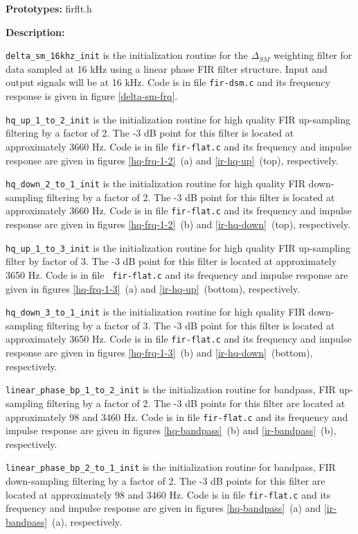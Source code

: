 {\bf Prototypes: }   firflt.h

{\bf Description: }

{\tt delta\_sm\_16khz\_init} is the initialization routine for the
$\Delta_{SM}$ weighting filter for data sampled at 16 kHz using a
linear phase FIR filter structure. Input and output signals will be at
16 kHz. Code is in file {\tt fir-dsm.c} and its frequency response is
given in figure \ref{delta-sm-frq}.

{\tt hq\_up\_1\_to\_2\_init} is the initialization routine for high
quality FIR up-sampling filtering by a factor of 2. The -3 dB point
for this filter is located at approximately 3660 Hz. Code is in file
{\tt fir-flat.c} and its frequency and impulse response are given in
figures \ref{hq-frq-1-2}~(a) and \ref{ir-hq-up}~(top), respectively.

{\tt hq\_down\_2\_to\_1\_init} is the initialization routine for high
quality FIR down-sampling filtering by a factor of 2. The -3 dB point
for this filter is located at approximately 3660 Hz. Code is in file
{\tt fir-flat.c} and its frequency and impulse response are given in
figures \ref{hq-frq-1-2}~(b) and \ref{ir-hq-down}~(top), respectively.

{\tt hq\_up\_1\_to\_3\_init} is the initialization routine for high
quality FIR up-sampling filter by factor of 3. The -3 dB point for
this filter is located at approximately 3650 Hz. Code is in file {\tt
fir-flat.c} and its frequency and impulse response are given in
figures \ref{hq-frq-1-3}~(a) and \ref{ir-hq-up}~(bottom), respectively.

{\tt hq\_down\_3\_to\_1\_init} is the initialization routine for high
quality FIR down-sampling filtering by a factor of 3. The -3 dB point
for this filter is located at approximately 3650 Hz. Code is in file
{\tt fir-flat.c} and its frequency and impulse response are given in
figures \ref{hq-frq-1-3}~(b) and \ref{ir-hq-down}~(bottom),
respectively.

{\tt linear\_phase\_bp\_1\_to\_2\_init} is the initialization routine
for bandpass, FIR up-sampling filtering by a factor of 2. The -3 dB
points for this filter are located at approximately 98 and 3460
Hz. Code is in file {\tt fir-flat.c} and its frequency and impulse
response are given in figures \ref{hq-bandpass}~(b) and
\ref{ir-bandpass}~(b), respectively.

{\tt linear\_phase\_bp\_2\_to\_1\_init} is the initialization routine
for bandpass, FIR down-sampling filtering by a factor of 2. The -3 dB
points for this filter are located at approximately 98 and 3460
Hz. Code is in file {\tt fir-flat.c} and its frequency and impulse
response are given in figures \ref{hq-bandpass}~(a) and
\ref{ir-bandpass}~(a), respectively.

